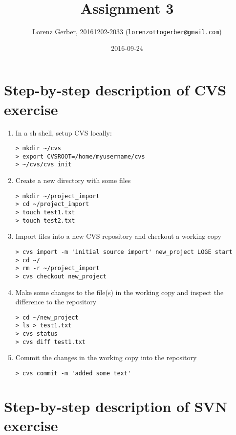\documentclass[a4paper,11pt,twoside]{article}
\title{Assignment 3}
\author{Lorenz Gerber, 20161202-2033 ({\tt{lorenzottogerber@gmail.com}})}
\date{2016-09-24}
\begin{document}
\lstset{language=C}
\maketitle
\thispagestyle{empty}
\newpage

\clearpage
{}

\section{Step-by-step description of CVS exercise}
\begin{enumerate}
\item
  In a sh shell, setup CVS locally:
\begin{verbatim}
> mkdir ~/cvs
> export CVSROOT=/home/myusername/cvs
> ~/cvs/cvs init
\end{verbatim}

\item
  Create a new directory with some files
\begin{verbatim}
> mkdir ~/project_import
> cd ~/project_import
> touch test1.txt
> touch test2.txt
\end{verbatim}

\item
  Import files into a new CVS repository and checkout a working copy
\begin{verbatim}
> cvs import -m 'initial source import' new_project LOGE start
> cd ~/
> rm -r ~/project_import
> cvs checkout new_project
\end{verbatim}


\item
  Make some changes to the file(s) in the working copy and inspect the difference to the repository
\begin{verbatim}
> cd ~/new_project
> ls > test1.txt
> cvs status
> cvs diff test1.txt
\end{verbatim}

\item
  Commit the changes in the working copy into the repository
\begin{verbatim}
> cvs commit -m 'added some text'
\end{verbatim}

\end{enumerate}

\section{Step-by-step description of SVN exercise}
\end{document}
